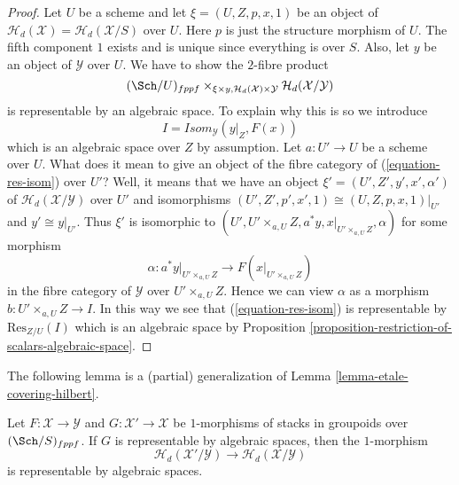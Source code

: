 \begin{proof}
Let $U$ be a scheme and let $\xi = (U, Z, p, x, 1)$ be an object of
$\mathcal{H}_d(\mathcal{X}) = \mathcal{H}_d(\mathcal{X}/S)$ over $U$.
Here $p$ is just the structure morphism of $U$.
The fifth component $1$ exists and is unique
since everything is over $S$.
Also, let $y$ be an object of $\mathcal{Y}$ over $U$.
We have to show the $2$-fibre product
\begin{equation}
\label{equation-res-isom}
(\Sch/U)_{fppf}
\times_{\xi \times y, \mathcal{H}_d(\mathcal{X}) \times \mathcal{Y}}
\mathcal{H}_d(\mathcal{X}/\mathcal{Y})
\end{equation}
is representable by an algebraic space. To explain why this is so
we introduce
$$
I = \mathit{Isom}_\mathcal{Y}(y|_Z, F(x))
$$
which is an algebraic space over $Z$ by assumption. Let $a : U' \to U$
be a scheme over $U$. What does it mean to give an object of the fibre
category of (\ref{equation-res-isom}) over $U'$? Well, it means that we
have an object $\xi' = (U', Z', y', x', \alpha')$ of
$\mathcal{H}_d(\mathcal{X}/\mathcal{Y})$ over $U'$ and isomorphisms
$(U', Z', p', x', 1) \cong (U, Z, p, x, 1)|_{U'}$ and
$y' \cong y|_{U'}$. Thus $\xi'$ is isomorphic to
$(U', U' \times_{a, U} Z, a^*y, x|_{U' \times_{a, U} Z}, \alpha)$
for some morphism
$$
\alpha :
a^*y|_{U' \times_{a, U} Z}
\longrightarrow
F(x|_{U' \times_{a, U} Z})
$$
in the fibre category of $\mathcal{Y}$ over $U' \times_{a, U} Z$. Hence
we can view $\alpha$ as a morphism $b : U' \times_{a, U} Z \to I$.
In this way we see that (\ref{equation-res-isom})
is representable by $\text{Res}_{Z/U}(I)$ which is an algebraic space by
Proposition \ref{proposition-restriction-of-scalars-algebraic-space}.
\end{proof}

\noindent
The following lemma is a (partial) generalization of
Lemma \ref{lemma-etale-covering-hilbert}.

\begin{lemma}
\label{lemma-representable-on-top}
Let $F : \mathcal{X} \to \mathcal{Y}$ and $G : \mathcal{X}' \to \mathcal{X}$
be $1$-morphisms of stacks in groupoids over $(\Sch/S)_{fppf}$.
If $G$ is representable by algebraic spaces, then the $1$-morphism
$$
\mathcal{H}_d(\mathcal{X}'/\mathcal{Y})
\longrightarrow
\mathcal{H}_d(\mathcal{X}/\mathcal{Y})
$$
is representable by algebraic spaces.
\end{lemma}

